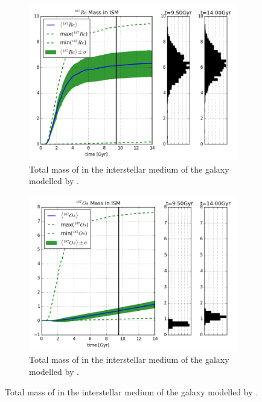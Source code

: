 \begin{figure}
  \centering
  \begin{subfigure}{\subfigwidth}
    \includegraphics[width=\linewidth]{results/MCExperiment_revised_2/combined_plot_Re-187_decayed.png}
    \caption{\label{fig:MCExperiment-re187}
      Total mass of  in the interstellar medium of the galaxy modelled by \omegamodel.
    }
  \end{subfigure}
  \begin{subfigure}{\subfigwidth}
    \includegraphics[width=\linewidth]{results/MCExperiment_revised_2/combined_plot_Os-187_decayed.png}
    \caption{\label{fig:MCExperiment-os187}
      Total mass of  in the interstellar medium of the galaxy modelled by \omegamodel.
}
\end{subfigure}
\end{figure}
